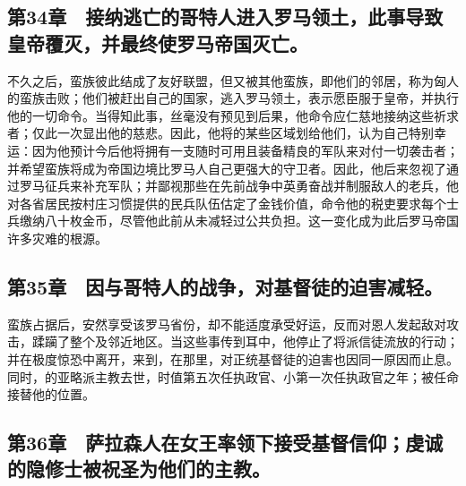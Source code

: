 
\subsection{第34章　接纳逃亡的哥特人进入罗马领土，此事导致皇帝覆灭，并最终使罗马帝国灭亡。}

不久之后，蛮族彼此结成了友好联盟，但又被其他蛮族，即他们的邻居，称为匈人的蛮族击败；他们被赶出自己的国家，逃入罗马领土，表示愿臣服于皇帝，并执行他的一切命令。当得知此事，丝毫没有预见到后果，他命令应仁慈地接纳这些祈求者；仅此一次显出他的慈悲。因此，他将的某些区域划给他们，认为自己特别幸运：因为他预计今后他将拥有一支随时可用且装备精良的军队来对付一切袭击者；并希望蛮族将成为帝国边境比罗马人自己更强大的守卫者。因此，他后来忽视了通过罗马征兵来补充军队；并鄙视那些在先前战争中英勇奋战并制服敌人的老兵，他对各省居民按村庄习惯提供的民兵队伍估定了金钱价值，命令他的税吏要求每个士兵缴纳八十枚金币，尽管他此前从未减轻过公共负担。这一变化成为此后罗马帝国许多灾难的根源。\par


\subsection{第35章　因与哥特人的战争，对基督徒的迫害减轻。}

蛮族占据后，安然享受该罗马省份，却不能适度承受好运，反而对恩人发起敌对攻击，蹂躏了整个及邻近地区。当这些事传到耳中，他停止了将派信徒流放的行动；并在极度惊恐中离开，来到，在那里，对正统基督徒的迫害也因同一原因而止息。同时，的亚略派主教去世，时值第五次任执政官、小第一次任执政官之年；被任命接替他的位置。\par


\subsection{第36章　萨拉森人在女王率领下接受基督信仰；虔诚的隐修士被祝圣为他们的主教。}

